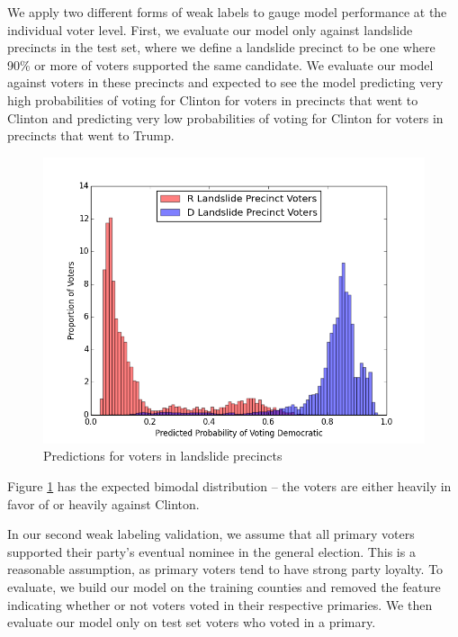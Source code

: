 \documentclass[10pt, letterpaper]{article}
\begin{document}
\begin{multicols}{2}
We apply two different forms of weak labels to gauge model performance at the individual voter level. First, we evaluate our model only against landslide precincts in the test set, where we define a landslide precinct to be one where 90\% or more of voters supported the same candidate. We evaluate our model against voters in these precincts and expected to see the model predicting very high probabilities of voting for Clinton for voters in precincts that went to Clinton and predicting very low probabilities of voting for Clinton for voters in precincts that went to Trump.

\begin{figure}[H]
\begin{center}
\includegraphics[scale=0.3]{lanslideHist19}
\end{center}
\caption{Predictions for voters in landslide precincts}
\label{fig:lanslideHist19}
\end{figure}

Figure \ref{fig:lanslideHist19} has the expected bimodal distribution -- the voters are either heavily in favor of or heavily against Clinton.

In our second weak labeling validation, we assume that all primary voters supported their party's eventual nominee in the general election. This is a reasonable assumption, as primary voters tend to have strong party loyalty. To evaluate, we build our model on the training counties and removed the feature indicating whether or not voters voted in their respective primaries. We then evaluate our model only on test set voters who voted in a primary.


\end{multicols}
\end{document}
